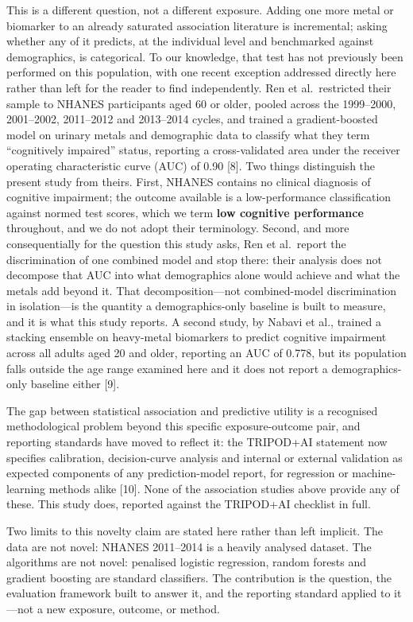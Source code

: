 \documentclass[12pt]{article}
\begin{document}
This is a different question, not a different exposure. Adding one more metal or biomarker to an already saturated association literature is incremental; asking whether any of it predicts, at the individual level and benchmarked against demographics, is categorical. To our knowledge, that test has not previously been performed on this population, with one recent exception addressed directly here rather than left for the reader to find independently. Ren et al.\ restricted their sample to NHANES participants aged 60 or older, pooled across the 1999--2000, 2001--2002, 2011--2012 and 2013--2014 cycles, and trained a gradient-boosted model on urinary metals and demographic data to classify what they term ``cognitively impaired'' status, reporting a cross-validated area under the receiver operating characteristic curve (AUC) of 0.90 [8]. Two things distinguish the present study from theirs. First, NHANES contains no clinical diagnosis of cognitive impairment; the outcome available is a low-performance classification against normed test scores, which we term \textbf{low cognitive performance} throughout, and we do not adopt their terminology. Second, and more consequentially for the question this study asks, Ren et al.\ report the discrimination of one combined model and stop there: their analysis does not decompose that AUC into what demographics alone would achieve and what the metals add beyond it. That decomposition---not combined-model discrimination in isolation---is the quantity a demographics-only baseline is built to measure, and it is what this study reports. A second study, by Nabavi et al., trained a stacking ensemble on heavy-metal biomarkers to predict cognitive impairment across all adults aged 20 and older, reporting an AUC of 0.778, but its population falls outside the age range examined here and it does not report a demographics-only baseline either [9].

The gap between statistical association and predictive utility is a recognised methodological problem beyond this specific exposure-outcome pair, and reporting standards have moved to reflect it: the TRIPOD+AI statement now specifies calibration, decision-curve analysis and internal or external validation as expected components of any prediction-model report, for regression or machine-learning methods alike [10]. None of the association studies above provide any of these. This study does, reported against the TRIPOD+AI checklist in full.

Two limits to this novelty claim are stated here rather than left implicit. The data are not novel: NHANES 2011--2014 is a heavily analysed dataset. The algorithms are not novel: penalised logistic regression, random forests and gradient boosting are standard classifiers. The contribution is the question, the evaluation framework built to answer it, and the reporting standard applied to it---not a new exposure, outcome, or method.
\end{document}
